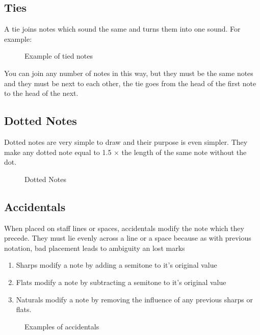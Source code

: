 \subsection* {Ties}

A tie joins notes which sound the same and turns them into one sound. For example:

\begin{figure}[h!]
  \centering
  \caption{Example of tied notes}
  \label{fig:RestCrochetQS}
\end{figure}

You can join any number of notes in this way, but they must be the same notes and they must be next to each other, the tie goes from the head of the first note to the head of the next.

\subsection*{Dotted Notes}

Dotted notes are very simple to draw and their purpose is even simpler. They make any dotted note equal to 1.5 $\times$ the length of the same note without the dot.

\begin{figure}[h!]
  \centering
  \caption{Dotted Notes}
  \label{fig:DottedNotes}
\end{figure}

\subsection*{Accidentals}

When placed on staff lines or spaces, accidentals modify the note which they precede. They must lie evenly across a line or a space because as with previous notation, bad placement leads to ambiguity an lost marks

\begin{enumerate}
\item Sharps modify a note by adding a semitone to it's original value
\item Flats modify a note by subtracting a semitone to it's original value
\item Naturals modify a note by removing the influence of any previous sharps or flats.
\end{enumerate}

\begin{figure}[h!]
  \centering
  \caption{Examples of accidentals}
  \label{fig:BassClef}
\end{figure}
